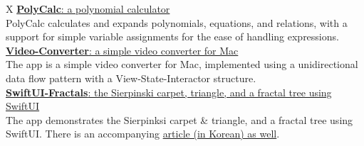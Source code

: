\documentclass[a4paper,10pt]{memoir}
\begin{document}
\begin{tblr}{X}
  \href{https://github.com/Zeta611/polycalc}{\textbf{PolyCalc}: a polynomial calculator}                                                                                                                                                                                                     \\
  PolyCalc calculates and expands polynomials, equations, and relations, with a support for simple variable assignments for the ease of handling expressions.                                                                                                                                \\

  \href{https://github.com/Zeta611/Video-Converter}{\textbf{Video-Converter}: a simple video converter for Mac}                                                                                                                                                                              \\
  The app is a simple video converter for Mac, implemented using a unidirectional data flow pattern with a View-State-Interactor structure.                                                                                                                                                  \\

  \href{https://github.com/Zeta611/SwiftUI-Fractals}{\textbf{SwiftUI-Fractals}: the Sierpinski carpet, triangle, and a fractal tree using SwiftUI}                                                                                                                                           \\
  The app demonstrates the Sierpinksi carpet \& triangle, and a fractal tree using SwiftUI. There is an accompanying \href{https://zetablog.io/posts/fractals-in-swiftui}{article (in Korean) as well}.                                                                                      \\
\end{tblr}
\end{document}
